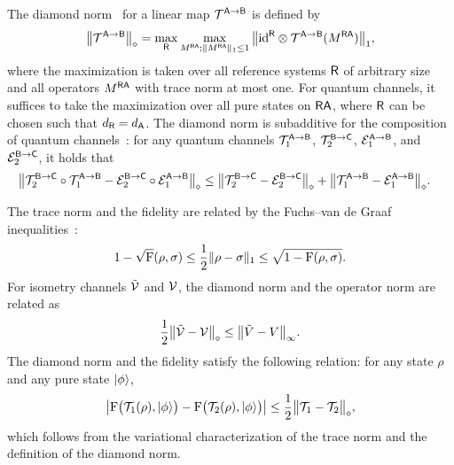The diamond norm~\cite{Kitaev1997QCAlgoEC, watrous2004notessuperoperatornorm, watrous2018TheoryQI} for a linear map ${\mathcal{T}}^{{\mathsf{A}}\rightarrow{\mathsf{B}}}$ is defined by
\begin{align}
    \big\|{\mathcal{T}}^{{\mathsf{A}}\rightarrow{\mathsf{B}}}\big\|_\diamond = \max_{{\mathsf{R}}}\max_{M^{{\mathsf{R}}{\mathsf{A}}}; \|M^{{\mathsf{R}}{\mathsf{A}}}\|_1 \leq 1}\big\|{\mathrm{id}}^{\mathsf{R}} \otimes {\mathcal{T}}^{{\mathsf{A}}\rightarrow{\mathsf{B}}}(M^{{\mathsf{R}}{\mathsf{A}}})\big\|_1, 
\end{align}
where the maximization is taken over all reference systems ${\mathsf{R}}$ of arbitrary size and all operators $M^{{\mathsf{R}}{\mathsf{A}}}$ with trace norm at most one.
For quantum channels, it suffices to take the maximization over all pure states on ${\mathsf{R}}{\mathsf{A}}$, where ${\mathsf{R}}$ can be chosen such that $d_{\mathsf{R}} = d_{\mathsf{A}}$.
The diamond norm is subadditive for the composition of quantum channels~\cite{watrous2018TheoryQI}: for any quantum channels ${\mathcal{T}}_1^{{\mathsf{A}}\rightarrow{\mathsf{B}}}$, ${\mathcal{T}}_2^{{\mathsf{B}}\rightarrow{\mathsf{C}}}$, ${\mathcal{E}}_1^{{\mathsf{A}}\rightarrow{\mathsf{B}}}$, and ${\mathcal{E}}_2^{{\mathsf{B}}\rightarrow{\mathsf{C}}}$, it holds that
\begin{align}
    &\big\|{\mathcal{T}}_2^{{\mathsf{B}}\rightarrow{\mathsf{C}}} \circ {\mathcal{T}}_1^{{\mathsf{A}}\rightarrow{\mathsf{B}}} - {\mathcal{E}}_2^{{\mathsf{B}}\rightarrow{\mathsf{C}}} \circ {\mathcal{E}}_1^{{\mathsf{A}}\rightarrow{\mathsf{B}}}\big\|_\diamond     \leq \big\|{\mathcal{T}}_2^{{\mathsf{B}}\rightarrow{\mathsf{C}}} - {\mathcal{E}}_2^{{\mathsf{B}}\rightarrow{\mathsf{C}}}\big\|_\diamond + \big\|{\mathcal{T}}_1^{{\mathsf{A}}\rightarrow{\mathsf{B}}} - {\mathcal{E}}_1^{{\mathsf{A}}\rightarrow{\mathsf{B}}}\big\|_\diamond.
\end{align}





The trace norm and the fidelity are related by the Fuchs--van de Graaf inequalities~\cite{Fuchs1999fuchsvandegraaf}: 
\begin{equation}
\label{eq:fuchs van de graaf}
   1-\sqrt{{\mathrm{F}}}(\rho, \sigma) \leq \frac{1}{2}\|\rho - \sigma \|_1 \leq \sqrt{1-{\mathrm{F}}(\rho, \sigma)}. 
\end{equation}
For isometry channels $\tilde{{\mathcal{V}}}$ and ${\mathcal{V}}$, the diamond norm and the operator norm are related as~\cite{Kitaev1997QCAlgoEC} 
\begin{align}
\label{eq:rel of operator and diamond norm}
    \frac{1}{2}\big\|\tilde{{\mathcal{V}}} - {\mathcal{V}}\big\|_\diamond \leq \big\|\tilde{V} - V\big\|_\infty.
\end{align}
The diamond norm and the fidelity satisfy the following relation: for any state $\rho$ and any pure state $|\phi\rangle$,
\begin{align}
\label{eq:fidelity and diamond}
    \big|{\mathrm{F}}\big({\mathcal{T}}_1(\rho), |\phi\rangle\big) - {\mathrm{F}}\big({\mathcal{T}}_2(\rho), |\phi\rangle\big)\big| \leq \frac{1}{2}\big\|{\mathcal{T}}_1 - {\mathcal{T}}_2\big\|_\diamond,
\end{align}
which follows from the variational characterization of the trace norm and the definition of the diamond norm.


